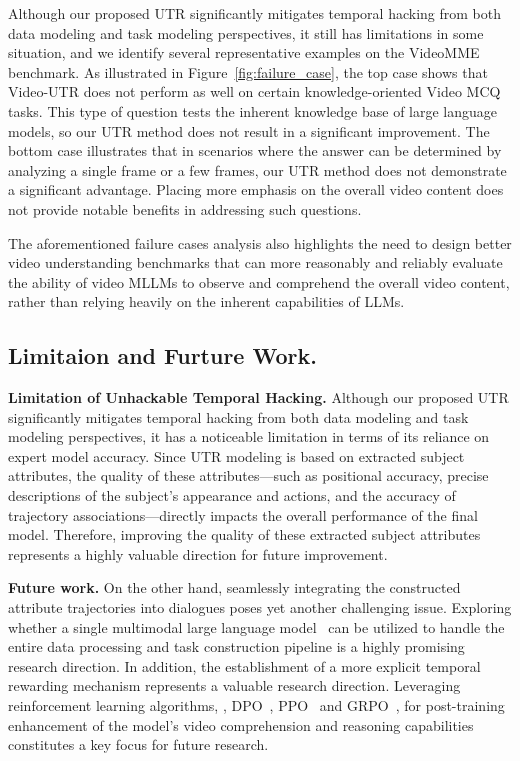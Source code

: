 Although our proposed UTR significantly mitigates temporal hacking from both data modeling and task modeling perspectives, it still has limitations in some situation, and we identify several representative examples on the VideoMME~\citep{videomme} benchmark. As illustrated in Figure~\ref{fig:failure_case}, the top case shows that Video-UTR does not perform as well on certain knowledge-oriented Video MCQ tasks. This type of question tests the inherent knowledge base of large language models, so our UTR method does not result in a significant improvement. The bottom case illustrates that in scenarios where the answer can be determined by analyzing a single frame or a few frames, our UTR method does not demonstrate a significant advantage. Placing more emphasis on the overall video content does not provide notable benefits in addressing such questions.

The aforementioned failure cases analysis also highlights the need to design better video understanding benchmarks that can more reasonably and reliably evaluate the ability of video MLLMs to observe and comprehend the overall video content, rather than relying heavily on the inherent capabilities of LLMs.

\subsection{Limitaion and Furture Work.}

\textbf{Limitation of Unhackable Temporal Hacking.} Although our proposed UTR significantly mitigates temporal hacking from both data modeling and task modeling perspectives, it has a noticeable limitation in terms of its reliance on expert model accuracy. Since UTR modeling is based on extracted subject attributes, the quality of these attributes—such as positional accuracy, precise descriptions of the subject’s appearance and actions, and the accuracy of trajectory associations—directly impacts the overall performance of the final model. Therefore, improving the quality of these extracted subject attributes represents a highly valuable direction for future improvement. 

\textbf{Future work.} On the other hand, seamlessly integrating the constructed attribute trajectories into dialogues poses yet another challenging issue. Exploring whether a single multimodal large language model~\citep{merlin, dreamllm, peng2024dreambench++} can be utilized to handle the entire data processing and task construction pipeline is a highly promising research direction. In addition, the establishment of a more explicit temporal rewarding mechanism represents a valuable research direction. Leveraging reinforcement learning algorithms, \eg, DPO~\citep{rafailov2024direct, zhu2025perpo}, PPO~\citep{schulman2017proximal} and GRPO~\citep{r1}, for post-training enhancement of the model's video comprehension and reasoning capabilities constitutes a key focus for future research.